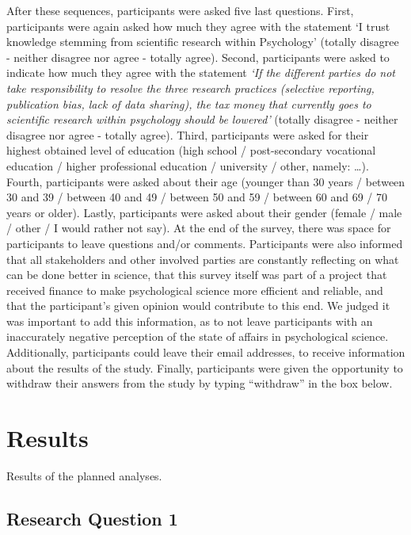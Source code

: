 \documentclass[
  man,floatsintext]{apa7}
\begin{document}
After these sequences, participants were asked five last questions. First,
participants were again asked how much they agree with the statement `I trust
knowledge stemming from scientific research within Psychology' (totally disagree
- neither disagree nor agree - totally agree). Second, participants were asked to
indicate how much they agree with the statement \emph{`If the different parties do not
take responsibility to resolve the three research practices (selective
reporting, publication bias, lack of data sharing), the tax money that
currently goes to scientific research within psychology should be
lowered'} (totally disagree - neither disagree nor agree - totally
agree). Third, participants were asked for their highest obtained
level of education (high school / post-secondary vocational education /
higher professional education / university / other, namely: \ldots). Fourth, participants were asked about their age (younger than 30 years / between 30 and 39 / between 40 and 49 / between 50 and 59 / between 60 and 69 / 70 years or older). Lastly, participants were asked about their gender (female / male / other / I would rather not say). At the end of the survey, there was space for participants to leave questions and/or comments.
Participants were also informed that all stakeholders and other involved parties are constantly
reflecting on what can be done better in science, that this survey
itself was part of a project that received finance to make psychological
science more efficient and reliable, and that the participant's given
opinion would contribute to this end. We judged it was important to add this information, as to not leave participants with an inaccurately negative perception of the state of affairs in psychological science. Additionally, participants could leave their email addresses, to receive information about the results of the study. Finally, participants were given the opportunity to withdraw their answers from the study by typing ``withdraw'' in the box below.

\hypertarget{results}{%
\section{Results}\label{results}}

Results of the planned analyses.

\hypertarget{research-question-1}{%
\subsection{Research Question 1}\label{research-question-1}}
\end{document}
